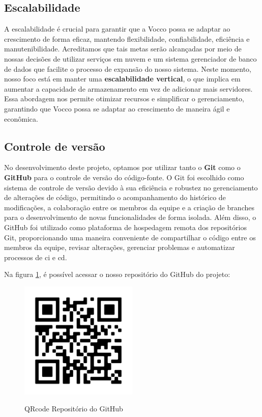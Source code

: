 \subsection{Escalabilidade}
A escalabilidade é crucial para garantir que a Vocco possa se adaptar ao crescimento de forma eficaz, mantendo flexibilidade, confiabilidade, eficiência e manutenibilidade. Acreditamos  que tais metas serão alcançadas por meio de nossas decisões de utilizar serviços em nuvem e um sistema gerenciador de banco de dados que facilite o processo de expansão do nosso sistema. Neste momento, nosso foco está em manter uma \textbf{escalabilidade vertical}, o que implica em aumentar a capacidade de armazenamento em vez de adicionar mais servidores. Essa abordagem nos permite otimizar recursos e simplificar o gerenciamento, garantindo que Vocco possa se adaptar ao crescimento de maneira ágil e econômica.
\subsection{Controle de versão}
 No desenvolvimento deste projeto, optamos por utilizar tanto o \textbf{Git} como o \textbf{GitHub} para o controle de versão do código-fonte. O Git foi escolhido como sistema de controle de versão devido à sua eficiência e robustez no gerenciamento de alterações de código, permitindo o acompanhamento do histórico de modificações, a colaboração entre os membros da equipe e a criação de branches para o desenvolvimento de novas funcionalidades de forma isolada. Além disso, o GitHub foi utilizado como plataforma de hospedagem remota dos repositórios Git, proporcionando uma maneira conveniente de compartilhar o código entre os membros da equipe, revisar alterações, gerenciar problemas e automatizar processos de \ac{ci} e \ac{cd}.

 Na figura \ref{github}, é possível acessar o nosso repositório do GitHub do projeto: 

\begin{figure}[ht]
        \centering
        \href{https://github.com/betatrix/Projeto-Integrado-I}{
        \includegraphics[width=0.5\textwidth]{images/qrcode-repo-github.png}
        }
        \caption{QRcode Repositório do GitHub}
        \label{github}
\end{figure}
 
